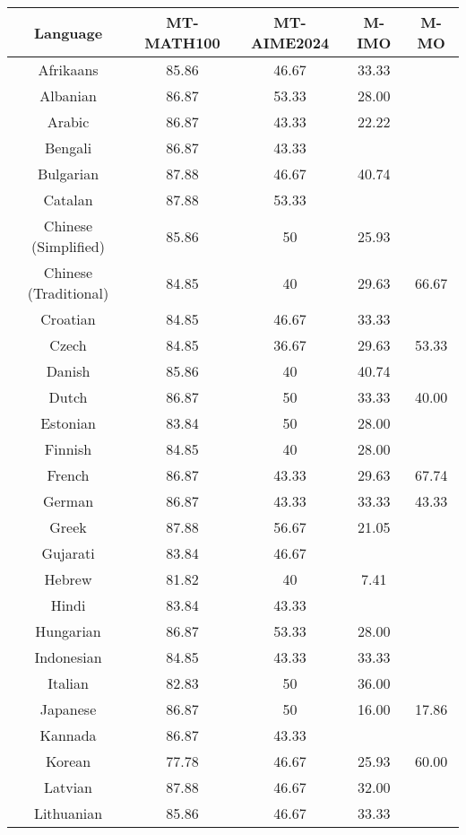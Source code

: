 \begin{table*}[]
\centering
\fontsize{9}{11} \selectfont
\begin{tabular}{c|cccc}
\toprule
\textbf{Language} & \textbf{MT-MATH100} & \textbf{MT-AIME2024} & \textbf{M-IMO} & \textbf{M-MO} \\ \midrule
Afrikaans & 85.86 & 46.67 & 33.33 &  \\
Albanian & 86.87 & 53.33 & 28.00 &  \\
Arabic & 86.87 & 43.33 & 22.22 &  \\
Bengali & 86.87 & 43.33 & \multicolumn{1}{l}{} &  \\
Bulgarian & 87.88 & 46.67 & 40.74 &  \\
Catalan & 87.88 & 53.33 & \multicolumn{1}{l}{} &  \\
Chinese (Simplified) & 85.86 & 50 & 25.93 &  \\
Chinese (Traditional) & 84.85 & 40 & 29.63 & \multirow{-2}{*}{66.67} \\
Croatian & 84.85 & 46.67 & 33.33 &  \\
Czech & 84.85 & 36.67 & 29.63 & 53.33 \\
Danish & 85.86 & 40 & 40.74 &  \\
Dutch & 86.87 & 50 & 33.33 & 40.00 \\
Estonian & 83.84 & 50 & 28.00 &  \\
Finnish & 84.85 & 40 & 28.00 &  \\
French & 86.87 & 43.33 & 29.63 & 67.74 \\
German & 86.87 & 43.33 & 33.33 & 43.33 \\
Greek & 87.88 & 56.67 & 21.05 &  \\
Gujarati & 83.84 & 46.67 & \multicolumn{1}{l}{} &  \\
Hebrew & 81.82 & 40 & 7.41 &  \\
Hindi & 83.84 & 43.33 & \multicolumn{1}{l}{} &  \\
Hungarian & 86.87 & 53.33 & 28.00 &  \\
Indonesian & 84.85 & 43.33 & 33.33 &  \\
Italian & 82.83 & 50 & 36.00 &  \\
Japanese & 86.87 & 50 & 16.00 & 17.86 \\
Kannada & 86.87 & 43.33 & \multicolumn{1}{l}{} &  \\
Korean & 77.78 & 46.67 & 25.93 & 60.00 \\
Latvian & 87.88 & 46.67 & 32.00 &  \\
Lithuanian & 85.86 & 46.67 & 33.33 &  \\

\end{tabular}
\end{table*}

